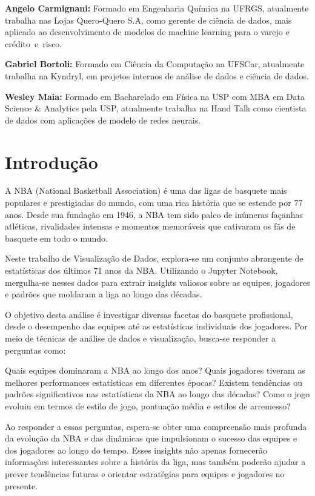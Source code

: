 \documentclass[
]{book}
\begin{document}
\textbf{Angelo Carmignani:} Formado em Engenharia Química na UFRGS, atualmente trabalha nas Lojas Quero-Quero S.A, como gerente de ciência de dados, mais aplicado ao desenvolvimento de modelos de machine learning para o varejo e crédito~e~risco.

\textbf{Gabriel Bortoli:} Formado em Ciência da Computação na UFSCar, atualmente trabalha na Kyndryl, em projetos internos de análise de dados e ciência de dados.

\textbf{Wesley Maia:} Formado em Bacharelado em Física na USP com MBA em Data Science \& Analytics pela USP, atualmente trabalha na Hand Talk como cientista de dados com aplicações de modelo de redes neurais.

\hypertarget{introduuxe7uxe3o}{%
\chapter{Introdução}\label{introduuxe7uxe3o}}

A NBA (National Basketball Association) é uma das ligas de basquete mais populares e prestigiadas do mundo, com uma rica história que se estende por 77 anos. Desde sua fundação em 1946, a NBA tem sido palco de inúmeras façanhas atléticas, rivalidades intensas e momentos memoráveis que cativaram os fãs de basquete em todo o mundo.

Neste trabalho de Visualização de Dados, explora-se um conjunto abrangente de estatísticas dos últimos 71 anos da NBA. Utilizando o Jupyter Notebook, mergulha-se nesses dados para extrair insights valiosos sobre as equipes, jogadores e padrões que moldaram a liga ao longo das décadas.

O objetivo desta análise é investigar diversas facetas do basquete profissional, desde o desempenho das equipes até as estatísticas individuais dos jogadores. Por meio de técnicas de análise de dados e visualização, busca-se responder a perguntas como:

Quais equipes dominaram a NBA ao longo dos anos?
Quais jogadores tiveram as melhores performances estatísticas em diferentes épocas?
Existem tendências ou padrões significativos nas estatísticas da NBA ao longo das décadas?
Como o jogo evoluiu em termos de estilo de jogo, pontuação média e estilos de arremesso?

Ao responder a essas perguntas, espera-se obter uma compreensão mais profunda da evolução da NBA e das dinâmicas que impulsionam o sucesso das equipes e dos jogadores ao longo do tempo. Esses insights não apenas fornecerão informações interessantes sobre a história da liga, mas também poderão ajudar a prever tendências futuras e orientar estratégias para equipes e jogadores no presente.
\end{document}
